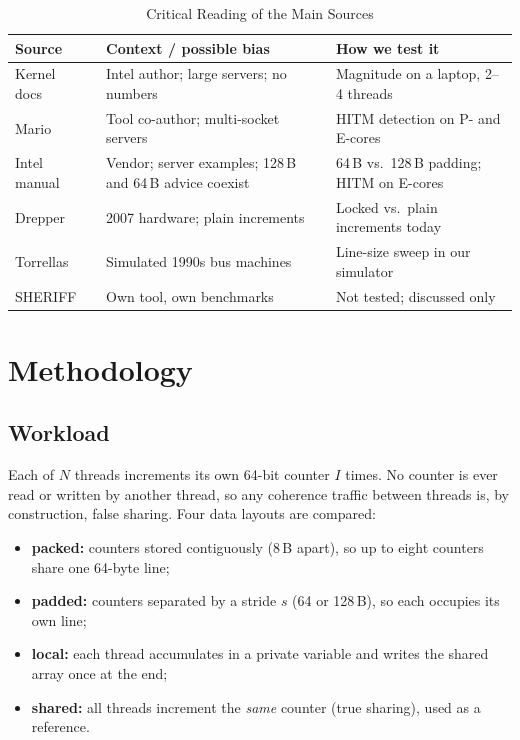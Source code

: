 \documentclass[journal]{IEEEtran}
\begin{document}
\begin{table}[!t]
\caption{Critical Reading of the Main Sources}
\label{tab:sources}
\centering
\footnotesize
\begin{tabular}{@{}p{}p{}p{}@{}}
\toprule
\textbf{Source} & \textbf{Context / possible bias} & \textbf{How we test it} \\
\midrule
Kernel docs~\cite{tang2023kernel} & Intel author; large servers; no numbers & Magnitude on a laptop, 2--4 threads \\
Mario~\cite{mario2016c2c} & Tool co-author; multi-socket servers & HITM detection on P- and E-cores \\
Intel manual~\cite{intel2024opt} & Vendor; server examples; 128\,B and 64\,B advice coexist & 64\,B vs.\ 128\,B padding; HITM on E-cores \\
Drepper~\cite{drepper2007memory} & 2007 hardware; plain increments & Locked vs.\ plain increments today \\
Torrellas~\cite{torrellas1994false} & Simulated 1990s bus machines & Line-size sweep in our simulator \\
SHERIFF~\cite{liu2011sheriff} & Own tool, own benchmarks & Not tested; discussed only \\
\bottomrule
\end{tabular}
\end{table}

\section{Methodology}
\label{sec:method}

\subsection{Workload}
Each of $N$ threads increments its own 64-bit counter $I$ times. No counter is
ever read or written by another thread, so any coherence traffic between
threads is, by construction, false sharing. Four data layouts are compared:
\begin{itemize}
  \item \textbf{packed:} counters stored contiguously (8\,B apart), so up to
        eight counters share one 64-byte line;
  \item \textbf{padded:} counters separated by a stride $s$ (64 or 128\,B),
        so each occupies its own line;
  \item \textbf{local:} each thread accumulates in a private variable and
        writes the shared array once at the end;
  \item \textbf{shared:} all threads increment the \emph{same} counter
        (true sharing), used as a reference.
\end{itemize}
\end{document}
